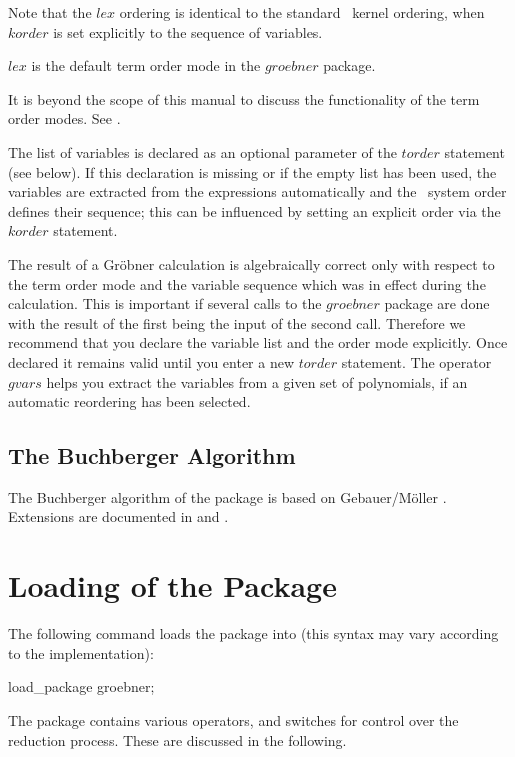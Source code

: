 Note that the $lex$ ordering is identical to the standard \REDUCE \ 
kernel ordering, when $korder$ is set explicitly to the sequence of
variables.

$lex$ is the default term order mode in the $groebner$ package.

It is beyond the scope of this manual to discuss the functionality of
the term order modes. See \cite{Buchberger:88}.

The list of variables is declared as an optional parameter of the
$torder$ statement (see below). If this declaration is missing
or if the empty list has been used, the variables are extracted from
the expressions automatically and the \REDUCE \  system order defines
their sequence; this can be influenced by setting an explicit order
via the $korder$ statement.

The result of a Gr\"obner calculation is algebraically correct only
with respect to the term order mode and the variable sequence
which was in effect during the calculation. This is important if
several calls to the $groebner$ package are done with the result of the
first being the input of the second call. Therefore we recommend
that you declare the variable list and the order mode explicitly.
Once declared it remains valid until you enter a new $torder$
statement. The operator $gvars$ helps you extract the variables
from a given set of polynomials, if an automatic reordering has been selected.

\subsection{The Buchberger Algorithm}
The Buchberger algorithm of the package is based on {\sc
Gebauer/M\"oller} \cite{Gebauer:88}.
Extensions are documented in \cite{Melenk:88} and \cite{Giovini:91}.

\section{Loading of the Package}
The following command loads the package into
\REDUCE (this syntax may vary according to the implementation):
\begin{center}
load\_package groebner;
\end{center}

The package contains various operators, and switches for control
over the reduction process. These are discussed in the following.

